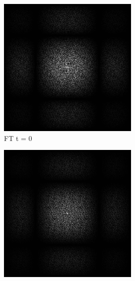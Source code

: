 \begin{figure}[H]

    \begin{subfigure}[b]{0.2\linewidth}
        \includegraphics[width=\linewidth]{content/TemporalerAlg/Bilder/Retargeting/Bedeutung Retargeting/RetargetSerie/seed_debug_3.0_small.png}
         \caption{FT t = 0}
         \label{pic:retarget_t0}
    \end{subfigure}
    \begin{subfigure}[b]{0.2\linewidth}
        \includegraphics[width=\linewidth]{content/TemporalerAlg/Bilder/Retargeting/Bedeutung Retargeting/RetargetSerie/seed_debug_4.0_small.png}

\end{subfigure}
\end{figure}
